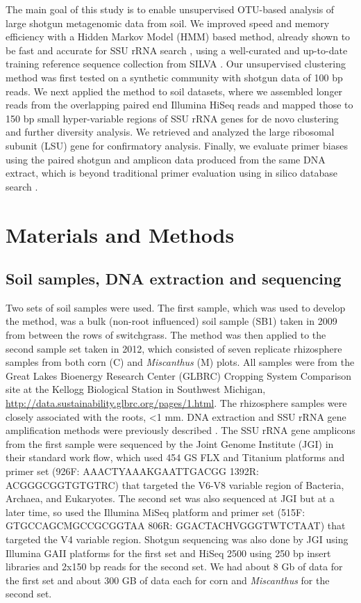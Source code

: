 \documentclass[]{msu-thesis}
\begin{document}
The main goal of this study is to enable unsupervised OTU-based analysis of large shotgun metagenomic data from soil. We improved speed and memory efficiency with a Hidden Markov Model (HMM) based method, already shown to be fast and accurate for SSU rRNA search \cite{huang_identification_2009,lee_rrnaselector:_2011,bengtsson_metaxa:_2011}, using a well-curated and up-to-date training reference sequence collection from SILVA \cite{quast_silva_2013}. Our unsupervised clustering method was first tested on a synthetic community with shotgun data of 100 bp reads. We next applied the method to soil datasets, where we assembled longer reads from the overlapping paired end Illumina HiSeq reads and mapped those to 150 bp small hyper-variable regions of SSU rRNA genes for de novo clustering and further diversity analysis. We retrieved and analyzed the large ribosomal subunit (LSU) gene for confirmatory analysis. Finally, we evaluate primer biases using the paired shotgun and amplicon data produced from the same DNA extract, which is beyond traditional primer evaluation using in silico database search \cite{mao_coverage_2012,klindworth_evaluation_2013}.

\section{Materials and Methods}

\subsection{Soil samples, DNA extraction and sequencing}
Two sets of soil samples were used. The first sample, which was used to develop the method, was a bulk (non-root influenced) soil sample (SB1) taken in 2009 from between the rows of switchgrass. The method was then applied to the second sample set taken in 2012, which consisted of seven replicate rhizosphere samples from both corn (C) and \textit{Miscanthus} (M) plots. All samples were from the Great Lakes Bioenergy Research Center (GLBRC) Cropping System Comparison site at the Kellogg Biological Station in Southwest Michigan, \url{http://data.sustainability.glbrc.org/pages/1.html}. The rhizosphere samples were closely associated with the roots, <1 mm.
DNA extraction and SSU rRNA gene amplification methods were previously described \cite{jesus_influence_2015}. The SSU rRNA gene amplicons from the first sample were sequenced by the Joint Genome Institute (JGI) in their standard work flow, which used 454 GS FLX and Titanium platforms and primer set (926F: AAACTYAAAKGAATTGACGG 1392R: ACGGGCGGTGTGTRC) that targeted the V6-V8 variable region of Bacteria, Archaea, and Eukaryotes. The second set was also sequenced at JGI but at a later time, so used the Illumina MiSeq platform and primer set (515F: GTGCCAGCMGCCGCGGTAA 806R: GGACTACHVGGGTWTCTAAT) that targeted the V4 variable region. Shotgun sequencing was also done by JGI using Illumina GAII platforms for the first set and HiSeq 2500 using 250 bp insert libraries and 2x150 bp reads for the second set. We had about 8 Gb of data for the first set and about 300 GB of data each for corn and \textit{Miscanthus} for the second set. 
\end{document}
